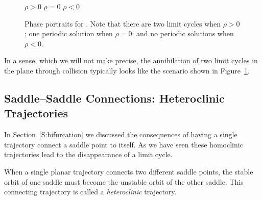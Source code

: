 \begin{figure}[htb]
           \centerline{%
	   }
 	\vspace*{-0.2in}
	\hspace{0.3in} $\rho>0$  \hspace{1.9in} $\rho=0$
		\hspace{1.9in} $\rho<0$ 
           \caption{Phase portraits for \protect{}. 
Note that there are two limit cycles when $\rho>0$; one periodic solution 
when  $\rho=0$; and no periodic solutions when $\rho<0$.}
           \label{F:papp}
\end{figure}

In a sense, which we will not make precise, the annihilation of two
limit cycles in the plane through collision typically looks like the 
scenario shown in Figure~\ref{F:papp}.  



\subsection*{Saddle--Saddle Connections: Heteroclinic Trajectories}

In Section~\ref{S:bifurcation} we discussed the consequences of having a 
single trajectory connect a saddle point to itself.  As we have seen these 
homoclinic trajectories lead to the disappearance of a limit cycle.

When a single planar trajectory connects two different saddle points, the 
stable orbit of one saddle must become the unstable orbit of the other 
saddle.  This connecting trajectory is called a {\em heteroclinic\/} 
trajectory.

